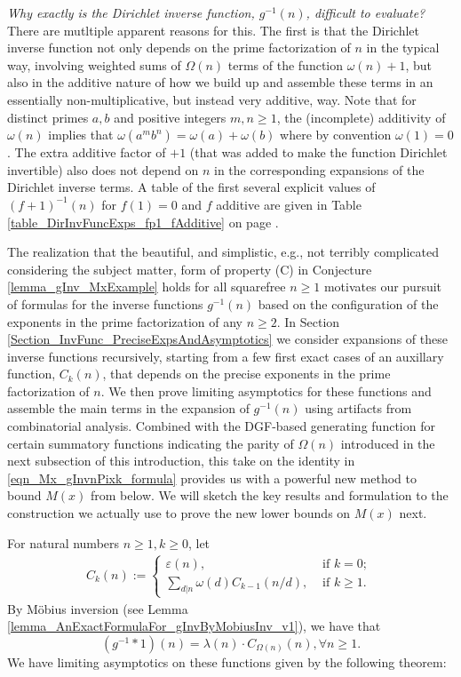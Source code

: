 \documentclass[11pt,reqno,a4letter]{article}
\numberwithin{figure}{section}
\numberwithin{table}{section}
\theoremstyle{plain}
\numberwithin{theorem}{section}
\theoremstyle{definition}
\begin{document}
\textit{Why exactly is the Dirichlet inverse function, $g^{-1}(n)$, difficult to evaluate? } 
There are mutltiple apparent reasons for this. The first is that the Dirichlet inverse function not only 
depends on the prime factorization of $n$ in the typical way, involving weighted sums of $\Omega(n)$ terms of the 
function $\omega(n) + 1$, but also in the additive nature of how we build up and assemble these terms in an essentially 
non-multiplicative, but instead very additive, way.  
Note that for distinct primes $a,b$ and positive integers $m,n \geq 1$, the 
(incomplete) additivity of $\omega(n)$ implies that $\omega(a^m b^n) = \omega(a) + \omega(b)$ where by convention 
$\omega(1) = 0$. The extra additive factor of $+1$ (that was added to make the function Dirichlet invertible) 
also does not depend on $n$ in the corresponding expansions of the Dirichlet inverse terms. 
A table of the first several explicit values of $(f+1)^{-1}(n)$ for $f(1) = 0$ and $f$ additive
are given in Table \ref{table_DirInvFuncExps_fp1_fAdditive} on page 
\pageref{table_DirInvFuncExps_fp1_fAdditive}. 

The realization that the beautiful, and simplistic, e.g., not terribly complicated considering the 
subject matter, form of property (C) 
in Conjecture \ref{lemma_gInv_MxExample} holds for all squarefree $n \geq 1$ 
motivates our pursuit of formulas for the inverse functions $g^{-1}(n)$ based on the configuration of the 
exponents in the prime factorization of any $n \geq 2$. 
In Section \ref{Section_InvFunc_PreciseExpsAndAsymptotics} we consider expansions of these inverse functions 
recursively, starting from a few first exact cases of an auxillary function, $C_k(n)$, 
that depends on the precise exponents in the prime factorization of $n$. 
We then prove limiting asymptotics for these functions and assemble the main terms in the expansion of 
$g^{-1}(n)$ using artifacts from combinatorial analysis. 
Combined with the DGF-based generating function for certain summatory functions indicating the parity of 
$\Omega(n)$ introduced in the next subsection of this introduction, 
this take on the identity in \eqref{eqn_Mx_gInvnPixk_formula} provides us with a powerful new method to 
bound $M(x)$ from below. 
We will sketch the key results and formulation to the construction we actually use to prove the 
new lower bounds on $M(x)$ next. 

For natural numbers $n \geq 1, k \geq 0$, let 
\begin{align*} 
C_k(n) := \begin{cases} 
     \varepsilon(n), & \text{ if $k = 0$; } \\ 
     \sum\limits_{d|n} \omega(d) C_{k-1}(n/d), & \text{ if $k \geq 1$. } 
     \end{cases} 
\end{align*} 
By M\"obius inversion (see Lemma \ref{lemma_AnExactFormulaFor_gInvByMobiusInv_v1}), 
we have that 
\[
(g^{-1} \ast 1)(n) = \lambda(n) \cdot C_{\Omega(n)}(n), \forall n \geq 1. 
\]
We have limiting asymptotics on these functions given by the following theorem: 
\end{document}
